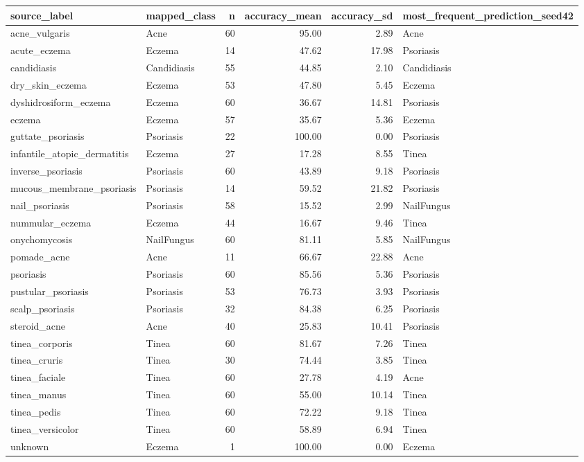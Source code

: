 \begin{tabular}{llrrrl}
\toprule
source\_label & mapped\_class & n & accuracy\_mean & accuracy\_sd & most\_frequent\_prediction\_seed42 \\
\midrule
acne\_vulgaris & Acne & 60 & 95.00 & 2.89 & Acne \\
acute\_eczema & Eczema & 14 & 47.62 & 17.98 & Psoriasis \\
candidiasis & Candidiasis & 55 & 44.85 & 2.10 & Candidiasis \\
dry\_skin\_eczema & Eczema & 53 & 47.80 & 5.45 & Eczema \\
dyshidrosiform\_eczema & Eczema & 60 & 36.67 & 14.81 & Psoriasis \\
eczema & Eczema & 57 & 35.67 & 5.36 & Eczema \\
guttate\_psoriasis & Psoriasis & 22 & 100.00 & 0.00 & Psoriasis \\
infantile\_atopic\_dermatitis & Eczema & 27 & 17.28 & 8.55 & Tinea \\
inverse\_psoriasis & Psoriasis & 60 & 43.89 & 9.18 & Psoriasis \\
mucous\_membrane\_psoriasis & Psoriasis & 14 & 59.52 & 21.82 & Psoriasis \\
nail\_psoriasis & Psoriasis & 58 & 15.52 & 2.99 & NailFungus \\
nummular\_eczema & Eczema & 44 & 16.67 & 9.46 & Tinea \\
onychomycosis & NailFungus & 60 & 81.11 & 5.85 & NailFungus \\
pomade\_acne & Acne & 11 & 66.67 & 22.88 & Acne \\
psoriasis & Psoriasis & 60 & 85.56 & 5.36 & Psoriasis \\
pustular\_psoriasis & Psoriasis & 53 & 76.73 & 3.93 & Psoriasis \\
scalp\_psoriasis & Psoriasis & 32 & 84.38 & 6.25 & Psoriasis \\
steroid\_acne & Acne & 40 & 25.83 & 10.41 & Psoriasis \\
tinea\_corporis & Tinea & 60 & 81.67 & 7.26 & Tinea \\
tinea\_cruris & Tinea & 30 & 74.44 & 3.85 & Tinea \\
tinea\_faciale & Tinea & 60 & 27.78 & 4.19 & Acne \\
tinea\_manus & Tinea & 60 & 55.00 & 10.14 & Tinea \\
tinea\_pedis & Tinea & 60 & 72.22 & 9.18 & Tinea \\
tinea\_versicolor & Tinea & 60 & 58.89 & 6.94 & Tinea \\
unknown & Eczema & 1 & 100.00 & 0.00 & Eczema \\
\bottomrule
\end{tabular}
